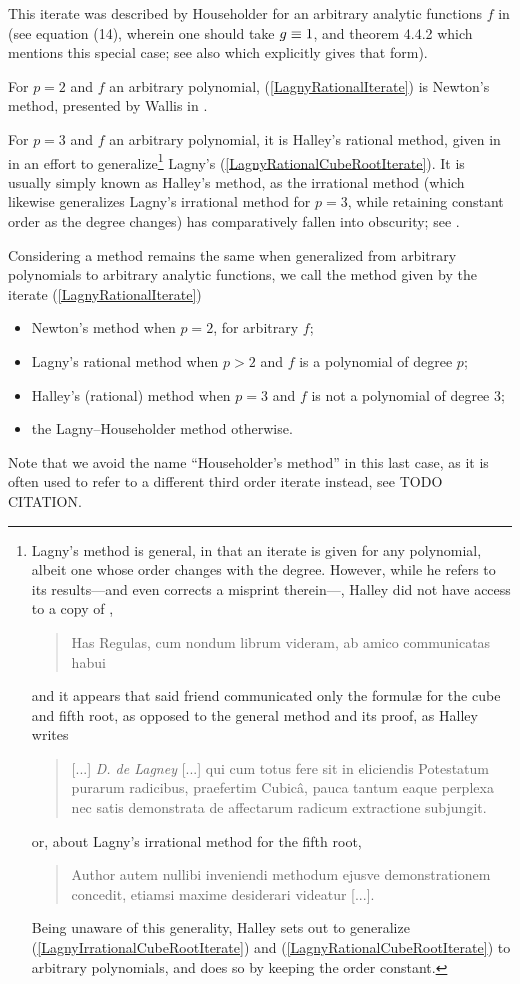 ﻿\documentclass[10pt, a4paper, twoside]{basestyle}
\begin{document}
This iterate was described by Householder for an arbitrary analytic functions $f$ in \cite[169]{Householder1970} (see
equation (14), wherein one should take $g\equiv 1$, and theorem 4.4.2 which mentions this special case; see also
\cite{SebahGourdon2001} which explicitly gives that form).

For $p=2$ and $f$ an arbitrary polynomial, (\ref{LagnyRationalIterate}) is Newton's method, presented by Wallis in
\cite[338]{Wallis1685}.

For $p=3$ and $f$ an arbitrary polynomial, it is Halley's rational method, given in \cite[142--143]{Halley1694} in
an effort to generalize\footnote{Lagny's method is general, in that an iterate is given for any
polynomial, albeit one whose order changes with the degree. However, while he refers to its
results---and even corrects a misprint therein---, Halley
did not have access to a copy of \cite{FantetdeLagny1692},
\begin{quote}
Has Regulas, cum nondum librum videram, ab amico communicatas habui
\end{quote}
and it appears that said friend communicated only the formulæ for the cube and fifth root, as opposed to the
general method and its proof, as Halley writes
\begin{quote}
[...] \emph{D. de Lagney} [...] qui cum totus fere sit in eliciendis Potestatum purarum radicibus,
praefertim Cubic\^a, pauca tantum eaque perplexa nec satis demonstrata de affectarum radicum
extractione subjungit.
\end{quote}
or, about Lagny's irrational method for the fifth root,
\begin{quote}
Author autem nullibi inveniendi methodum ejusve demonstrationem concedit,
etiamsi maxime desiderari videatur [...].
\end{quote}
Being unaware of this generality, Halley sets out to generalize (\ref{LagnyIrrationalCubeRootIterate}) and (\ref{LagnyRationalCubeRootIterate}) to
arbitrary polynomials, and does so by keeping the order constant.} Lagny's (\ref{LagnyRationalCubeRootIterate}).
It is usually simply known as Halley's method, as the irrational method (which likewise generalizes Lagny's irrational
method for $p=3$, while retaining constant order as the degree changes) has comparatively fallen into obscurity;
see \cite{ScavoThoo1995}.

Considering a method remains the same when generalized from arbitrary polynomials to arbitrary analytic functions,
we call the method given by the iterate (\ref{LagnyRationalIterate})\begin{itemize}
\setlength\itemsep{0em}
\item Newton’s method when $p=2$, for arbitrary $f$;
\item Lagny’s rational method when $p>2$ and $f$ is a polynomial of degree $p$;
\item Halley’s (rational) method when $p=3$ and $f$ is not a polynomial of degree $3$;
\item the Lagny--Householder method otherwise.
\end{itemize}
Note that we avoid the name ``Householder’s method'' in this last case, as it is often used to refer to a
different third order iterate instead, see TODO CITATION.
\end{document}
